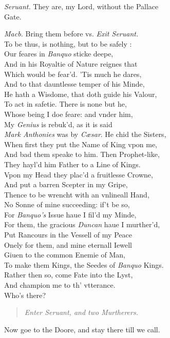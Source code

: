 \documentclass[12pt]{sides}
\newcommand{\StageDir}[1]{\begin{quote}\centering\em #1\end{quote}}
\newcommand{\clStageDir}[1]{\hspace*{\fill}\textit{#1}\hspace*{\fill}}
\newcommand{\dia}[1]{\hskip 15pt\textit{#1}\hskip 6pt}
\begin{document}
\begin{multicols}{2}
            \dia{Seruant.} They are, my Lord, without the Pallace \\ Gate.

            \dia{Macb.} Bring them before vs. \clStageDir{Exit Seruant.} \\ To be thus, is nothing, but to be safely : \\ Our feares in \textit{Banquo} sticke deepe, \\ And in his Royaltie of Nature reignes that \\ Which would be fear'd. 'Tis much he dares, \\ And to that dauntlesse temper of his Minde, \\ He hath a Wisdome, that doth guide his Valour, \\ To act in safetie. There is none but he, \\ Whose being I doe feare: and vnder him, \\ My \textit{Genius} is rebuk'd, as it is said \\ \textit{Mark Anthonies} was by \textit{C{\ae}sar}. He chid the Sisters, \\ When first they put the Name of King vpon me, \\ And bad them speake to him. Then Prophet-like, \\ They hayl'd him Father to a Line of Kings. \\ Vpon my Head they plac'd a fruitlesse Crowne, \\ And put a barren Scepter in my Gripe, \\ Thence to be wrencht with an vnlineall Hand, \\ No Sonne of mine succeeding: if't be so, \\ For \textit{Banquo's} Issue haue I fil'd my Minde, \\ For them, the gracious \textit{Duncan} haue I murther'd, \\ Put Rancours in the Vessell of my Peace \\ Onely for them, and mine eternall Iewell \\ Giuen to the common Enemie of Man, \\ To make them Kings, the Seedes of \textit{Banquo} Kings. \\ Rather then so, come Fate into the Lyst, \\ And champion me to th' vtterance. \\ Who's there?
            \StageDir{Enter Seruant, and two Murtherers.}
            Now goe to the Doore, and stay there till we call. 
            

\end{multicols}
\end{document}
